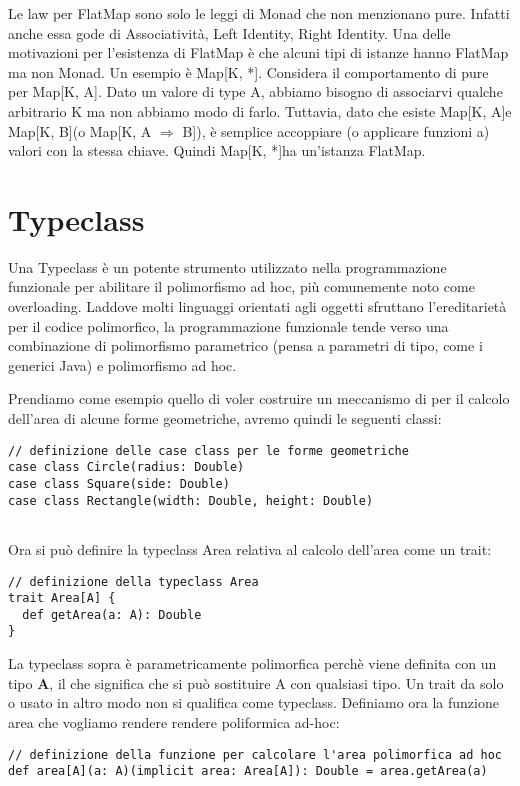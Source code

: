 \noindent Le law per FlatMap sono solo le leggi di Monad che non menzionano pure. Infatti anche essa gode di Associatività, Left Identity, Right Identity. Una delle motivazioni per l'esistenza di FlatMap è che alcuni tipi di istanze hanno FlatMap ma non Monad. Un esempio è Map[K, *]. Considera il comportamento di pure per Map[K, A]. Dato un valore di type A, abbiamo bisogno di associarvi qualche arbitrario K ma non abbiamo modo di farlo. Tuttavia, dato che esiste Map[K, A]e Map[K, B](o Map[K, A $\Rightarrow$ B]), è semplice accoppiare (o applicare funzioni a) valori con la stessa chiave. Quindi Map[K, *]ha un'istanza FlatMap.



\section{Typeclass}
Una Typeclass è un potente strumento utilizzato nella programmazione funzionale per abilitare il polimorfismo ad hoc, più comunemente noto come overloading. Laddove molti linguaggi orientati agli oggetti sfruttano l'ereditarietà per il codice polimorfico, la programmazione funzionale tende verso una combinazione di polimorfismo parametrico (pensa a parametri di tipo, come i generici Java) e polimorfismo ad hoc.

\noindent Prendiamo come esempio quello di voler costruire un meccanismo di per il calcolo dell'area di alcune forme geometriche, avremo quindi le seguenti classi:
\begin{verbatim}
// definizione delle case class per le forme geometriche
case class Circle(radius: Double)
case class Square(side: Double)
case class Rectangle(width: Double, height: Double)
    
\end{verbatim}

\noindent Ora si può definire la typeclass Area relativa al calcolo dell'area come un trait:

\begin{verbatim}
// definizione della typeclass Area
trait Area[A] {
  def getArea(a: A): Double
}
\end{verbatim}

\noindent La typeclass sopra è parametricamente polimorfica perchè viene definita con un tipo \textbf{A}, il che significa che si può sostituire A con qualsiasi tipo. Un trait da solo o usato in altro modo non si qualifica come typeclass. Definiamo ora la funzione area che vogliamo rendere rendere poliformica ad-hoc:
\begin{verbatim}
// definizione della funzione per calcolare l'area polimorfica ad hoc
def area[A](a: A)(implicit area: Area[A]): Double = area.getArea(a)
\end{verbatim}


